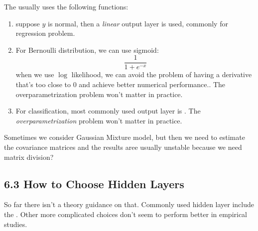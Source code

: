         The  usually uses the following functions:
        \begin{enumerate}
            \item suppose \(y\) is normal, then a \textit{linear} output layer is used, commonly for regression problem. 
            \item For Bernoulli distribution, we can use sigmoid:
            \begin{equation*}
                \frac{1}{1+ e^{-x}}
            \end{equation*}
            when we use \(\log\) likelihood, we can avoid the problem of having a derivative that's too close to \(0\) and achieve better numerical performance.. The overparametrization problem won't matter in practice.
            \item For classification, most commonly used output layer is . The \textit{overparametrization} problem won't matter in practice.
        \end{enumerate}
        
        Sometimes we consider Gaussian Mixture model, but then we need to estimate the covariance matrices and the results aree usually unstable because we need matrix division?

        \subsection{6.3 How to Choose Hidden Layers}
        So far there isn't a theory guidance on that. Commonly used hidden layer include the . Other more complicated choices don't seem to perform better in empirical studies. 


